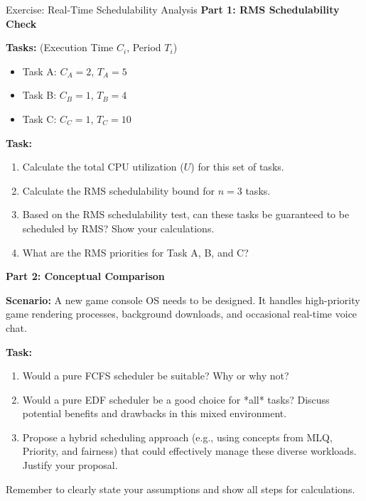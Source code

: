 \documentclass[aspectratio=169,11pt]{beamer}
\begin{document}
\begin{frame}[allowframebreaks]{Exercise: Real-Time Schedulability Analysis}
  \small
  \textbf{Part 1: RMS Schedulability Check}

  \textbf{Tasks:} (Execution Time $C_i$, Period $T_i$)
  \begin{itemize}
      \item Task A: $C_A=2$, $T_A=5$
      \item Task B: $C_B=1$, $T_B=4$
      \item Task C: $C_C=1$, $T_C=10$
  \end{itemize}
  \textbf{Task:}
  \begin{enumerate}
      \item Calculate the total CPU utilization ($U$) for this set of tasks.
      \item Calculate the RMS schedulability bound for $n=3$ tasks.
      \item Based on the RMS schedulability test, can these tasks be guaranteed to be scheduled by RMS? Show your calculations.
      \item What are the RMS priorities for Task A, B, and C?
  \end{enumerate}

  \vspace{0.5cm}

  \textbf{Part 2: Conceptual Comparison}

  \textbf{Scenario:} A new game console OS needs to be designed. It handles high-priority game rendering processes, background downloads, and occasional real-time voice chat.

  \textbf{Task:}
  \begin{enumerate}
      \item Would a pure FCFS scheduler be suitable? Why or why not?
      \item Would a pure EDF scheduler be a good choice for *all* tasks? Discuss potential benefits and drawbacks in this mixed environment.
      \item Propose a hybrid scheduling approach (e.g., using concepts from MLQ, Priority, and fairness) that could effectively manage these diverse workloads. Justify your proposal.
  \end{enumerate}

  \vspace{0.5cm}
  \begin{tcolorbox}[title=\textbf{Reminder}, colback=green!5!white, colframe=green!75!black, fonttitle=\bfseries]
  Remember to clearly state your assumptions and show all steps for calculations.
  \end{tcolorbox}
\end{frame}
\end{document}
